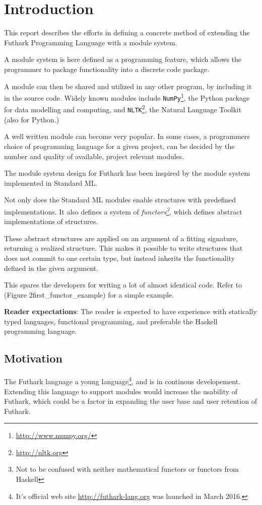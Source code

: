 \section{Introduction}
\label{sec:introduction}
This report describes the efforts in defining a concrete method of extending the Futhark Programming Language with a module system.

A module system is here defined as a programming feature, which allows the programmer to package functionality into a discrete code package.

A module can then be shared and utilized in any other program, by including it in the source code. Widely known modules include \texttt{NumPy}\footnote{\url{http://www.numpy.org/}}, the Python package for
data modelling and computing, and \texttt{NLTK}\footnote{\url{http://nltk.org}},
the Natural Language Toolkit (also for Python.)


A well written module can become very popular. In some cases, a programmers choice of programming language for a given project, can be decided by the number and quality of available, project relevant modules.


The module system design for Futhark has been inspired by the module system implemented in Standard ML\cite{crash_course}. 

Not only does the Standard ML modules enable structures with predefined implementations. It also defines a system of \textit{functors\footnote{Not to be confused with neither mathematical functors or functors from Haskell}}, which defines abstract implementations of structures.


These abstract structures are applied on an argument of a fitting signature, returning a realized structure. This makes it possible to write structures that does not commit to one certain type, but instead inherits the functionality defined in the given argument.


This spares the developers for writing a lot of almost identical code. Refer to (Figure 2{first_functor_example}) for a simple example.


\textbf{Reader expectations}:
The reader is expected to have experience with statically typed languages, functional programming, and preferable the Haskell programming language.
\pagebreak
\subsection{Motivation}
\label{subsec:label}
The Futhark language a young language\footnote{It's official web site \url{http://futhark-lang.org} was launched in March 2016.}, and is in continous developement. Extending this language to support modules would increase the usability of Futhark, which could be a factor in expanding the user base and user retention
of Futhark.


